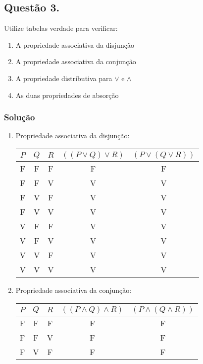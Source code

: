 \documentclass[12pt, letterpaper]{report}
\newcounter{ProblemNum}
\newcommand*{\anyproblem}[1]{\newpage\subsection*{#1}}
\newcommand*{\problem}[1]{\stepcounter{ProblemNum} %
   \anyproblem{Questão #1}}
\newcommand*{\soln}[1]{\subsubsection*{#1}}
\newcommand*{\solution}{\soln{Solução}}
\begin{document}
\problem{3.}
  Utilize tabelas verdade para verificar:

  \begin{enumerate}[label=\arabic*.]
    \item A propriedade associativa da disjunção
    \item A propriedade associativa da conjunção
    \item A propriedade distributiva para $\lor$ e $\land$
    \item As duas propriedades de absorção
  \end{enumerate}

\solution
  \begin{enumerate}[label=\arabic*.]
    \item Propriedade associativa da disjunção:
            \begin{table}[ht!]
            \centering
            \begin{tabular}{| c | c | c | c | c |}
              \hline
              $ P $ & $ Q $ & $ R $ & $ ((P \lor Q) \lor R) $ & $ (P \lor (Q \lor R)) $ \\
              \hline
              F & F & F & F & F \\ \hline
              F & F & V & V & V \\ \hline
              F & V & F & V & V \\ \hline
              F & V & V & V & V \\ \hline
              V & F & F & V & V \\ \hline
              V & F & V & V & V \\ \hline
              V & V & F & V & V \\ \hline
              V & V & V & V & V \\ \hline
            \end{tabular}
          \end{table}
    \item Propriedade associativa da conjunção:
            \begin{table}[ht!]
            \centering
            \begin{tabular}{| c | c | c | c | c |}
              \hline
              $ P $ & $ Q $ & $ R $ & $ ((P \land Q) \land R) $ & $ (P \land (Q \land R)) $ \\
              \hline
              F & F & F & F & F \\ \hline
              F & F & V & F & F \\ \hline
              F & V & F & F & F \\ \hline

\end{tabular}
\end{table}
\end{enumerate}
\end{document}
